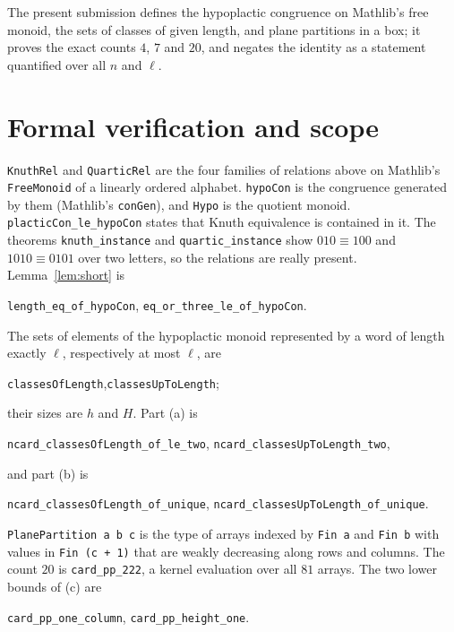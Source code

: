 \documentclass[11pt]{article}
\theoremstyle{remark}
\newcommand{\hypo}{\equiv}
\begin{document}
The present submission defines the hypoplactic congruence on Mathlib's
free monoid, the sets of classes of given length, and plane partitions
in a box; it proves the exact counts $4$, $7$ and $20$, and negates the
identity as a statement quantified over all $n$ and $\ell$.

\section*{Formal verification and scope}
\texttt{KnuthRel} and \texttt{QuarticRel} are the four families of
relations above on Mathlib's \texttt{FreeMonoid} of a linearly ordered
alphabet. \texttt{hypoCon} is the congruence generated by them
(Mathlib's \texttt{conGen}), and \texttt{Hypo} is the quotient monoid.
\texttt{placticCon\_le\_hypoCon} states that Knuth equivalence is
contained in it. The theorems \texttt{knuth\_instance} and
\texttt{quartic\_instance} show $010\hypo100$ and $1010\hypo0101$ over
two letters, so the relations are really present. Lemma~\ref{lem:short}
is
\begin{center}\small
\texttt{length\_eq\_of\_hypoCon},\quad
\texttt{eq\_or\_three\_le\_of\_hypoCon}.
\end{center}

The sets of elements of the hypoplactic monoid represented by a word of
length exactly $\ell$, respectively at most $\ell$, are
\begin{center}\small
\texttt{classesOfLength},\quad \texttt{classesUpToLength};
\end{center}
their sizes are $h$ and $H$. Part (a) is
\begin{center}\small
\texttt{ncard\_classesOfLength\_of\_le\_two},\quad
\texttt{ncard\_classesUpToLength\_two},
\end{center}
and part (b) is
\begin{center}\small
\texttt{ncard\_classesOfLength\_of\_unique},\quad
\texttt{ncard\_classesUpToLength\_of\_unique}.
\end{center}

\texttt{PlanePartition a b c} is the type of arrays indexed by
\texttt{Fin a} and \texttt{Fin b} with values in \texttt{Fin (c + 1)}
that are weakly decreasing along rows and columns. The count $20$ is
\texttt{card\_pp\_222}, a kernel evaluation over all $81$ arrays. The
two lower bounds of (c) are
\begin{center}\small
\texttt{card\_pp\_one\_column},\quad
\texttt{card\_pp\_height\_one}.
\end{center}
\end{document}
